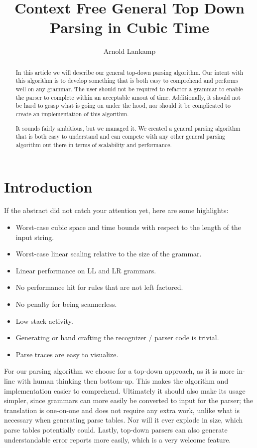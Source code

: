 \documentclass[a4paper,10pt]{article}
\title{Context Free General Top Down Parsing in Cubic Time}
\author{Arnold Lankamp}
\begin{document}
\maketitle

\begin{abstract}

In this article we will describe our general top-down parsing algorithm. Our intent with this algorithm is to develop something that is both easy to comprehend and performs well on any grammar. The user should not be required to refactor a grammar to enable the parser to complete within an acceptable amout of time. Additionally, it should not be hard to grasp what is going on under the hood, nor should it be complicated to create an implementation of this algorithm.

It sounds fairly ambitious, but we managed it. We created a general parsing algorithm that is both easy to understand and can compete with any other general parsing algorithm out there in terms of scalability and performance.

\end{abstract}

\section{Introduction}

If the abstract did not catch your attention yet, here are some highlights:
\begin{itemize}
 \setlength{\itemsep}{0pt}
 \setlength{\parskip}{0pt}
 \setlength{\parsep}{0pt}
 
 \item Worst-case cubic space and time bounds with respect to the length of the input string.
 \item Worst-case linear scaling relative to the size of the grammar.
 \item Linear performance on LL and LR grammars.
 \item No performance hit for rules that are not left factored.
 \item No penalty for being scannerless.
 \item Low stack activity.
 \item Generating or hand crafting the recognizer / parser code is trivial.
 \item Parse traces are easy to visualize.
\end{itemize}

For our parsing algorithm we choose for a top-down approach, as it is more in-line with human thinking then bottom-up. This makes the algorithm and implementation easier to comprehend. Ultimately it should also make its usage simpler, since grammars can more easily be converted to input for the parser; the translation is one-on-one and does not require any extra work, unlike what is necessary when generating parse tables. Nor will it ever explode in size, which parse tables potentially could. Lastly, top-down parsers can also generate understandable error reports more easily, which is a very welcome feature.
\end{document}
